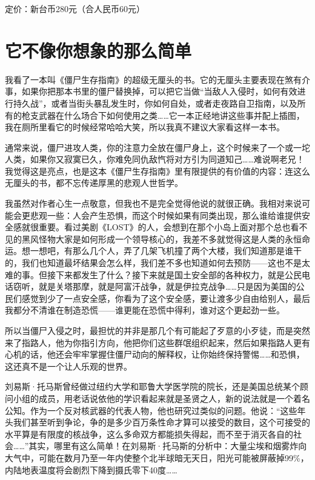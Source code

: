 定价：新台币280元（合人民币60元）

\section{它不像你想象的那么简单}

我看了一本叫《僵尸生存指南》的超级无厘头的书。它的无厘头主要表现在煞有介事，如果你把那本书里的僵尸替换掉，可以把它当做``当敌人入侵时，如何有效进行持久战''，或者当街头暴乱发生时，你如何自处，或者走夜路自卫指南，以及所有的枪支武器在什么场合下如何使用之类\ldots{}\ldots{}它一本正经地讲这些事并配上插图，我在厕所里看它的时候经常哈哈大笑，所以我真不建议大家看这样一本书。

通常来说，僵尸进攻人类，你的注意力全放在僵尸身上，这个时候来了一个或一坨人类，如果你又寂寞已久，你难免同仇敌忾将对方引为同道知己\ldots{}\ldots{}难说啊老兄！我觉得这是亮点，也是这本《僵尸生存指南》里有限提供的有价值的内容：连这么无厘头的书，都不忘传递厚黑的悲观人世哲学。

我虽然对作者心生一点敬意，但我也不是完全觉得他说的就很正确。我相对来说可能会更悲观一些：人会产生恐惧，而这个时候如果有同类出现，那么谁给谁提供安全感就很重要。看过美剧《LOST》的人，会想到在那个小岛上面对那个总也看不见的黑风怪物大家是如何形成一个领导核心的，我差不多就觉得这是人类的永恒命运。想一想吧，有那么几个人，弄了几架飞机撞了两个大楼，我们知道那是谁干的，我们也知道最坏结果会怎么样，我们差不多也知道如何去预防------这也不是太难的事。但接下来都发生了什么？接下来就是国土安全部的各种权力，就是公民电话窃听，就是关塔那摩，就是阿富汗战争，就是伊拉克战争\ldots{}\ldots{}只是因为美国的公民们感觉到少了一点安全感，你看为了这个安全感，要让渡多少自由给别人，最后我都分不清谁在制造恐慌------谁更能在恐慌中得利，谁对这个更起劲一些。

所以当僵尸入侵之时，最担忧的并非是那几个有可能起了歹意的小歹徒，而是突然来了指路人，他为你指引方向，他把你们这些群氓组织起来，然后如果指路人更有心机的话，他还会牢牢掌握住僵尸动向的解释权，让你始终保持警惕\ldots{}\ldots{}和恐惧，这还真不是一个让人乐观的世界。

刘易斯·托马斯曾经做过纽约大学和耶鲁大学医学院的院长，还是美国总统某个顾问小组的成员，用老话说依他的学识看起来就是圣贤之人，新的说法就是一个着名公知。作为一个反对核武器的代表人物，他也研究过类似的问题。他说：``这些年头我们甚至听到争论，争的是多少百万条性命才算可以接受的数目，这个可接受的水平算是有限度的核战争，这么多命双方都能损失得起，而不至于消灭各自的社会\ldots{}\ldots{}''其实，哪里有这么简单！在刘易斯·托马斯的分析中：大量尘埃和烟雾炸向大气中，可能在数月乃至一年内使整个北半球暗无天日，阳光可能被屏蔽掉99\%，内陆地表温度将会剧烈下降到摄氏零下40度\ldots{}\ldots{}

